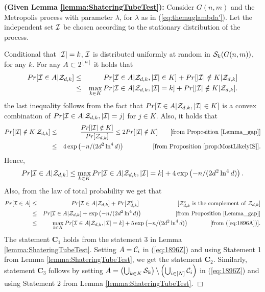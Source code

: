\documentclass[a4paper,10pt]{article}
\makeatletter
\newenvironment{lemmaproof}[1]{\noindent{\bf Proof of Lemma #1\@}}{\hfill $\Box$\\}
\newcommand\cZ{\mathcal{Z}}
\makeatother
\begin{document}
\begin{lemmaproof}{\ref{lemma:ShateringTube}}
{\bf (Given Lemma \ref{lemma:ShateringTubeTest}):}
Consider $G(n,m)$ and the Metropolis process with parameter 
$\lambda$, for $\lambda$ as in (\ref{eq:themuglambda'}).
Let the independent set ${\cal I}$ be chosen according to 
the stationary distribution of the process. 

Conditional that $|{\cal I}|=k$, ${\cal I}$ is distributed
uniformly at random in ${\cal S}_k(G(n,m))$, for any $k$.
For any $A\subset 2^{[n]}$ it holds that
\begin{eqnarray}
Pr[{\cal I}\in A |\cZ_{d,k} ]&\leq& Pr[{\cal I}\in A|\cZ_{d,k},|{\cal I}|\in K]+Pr[|{\cal I}|\notin K|\cZ_{d,k}]
\nonumber \\ 
&\leq&\displaystyle \max_{k\in K}Pr[{\cal I}\in A |\cZ_{d,k},|{\cal I}|=k]+Pr[|{\cal I}|\notin K|\cZ_{d,k}].
\nonumber
\end{eqnarray}
the last inequality follows from the fact that $Pr[{\cal I}\in A|\cZ_{d,k},|{\cal I}|\in K]$
is a convex combination of $Pr[{\cal I}\in A |\cZ_{d,k},|{\cal I}|=j]$ for $j\in K$.
Also, it holds  that
\begin{eqnarray}
Pr[|{\cal I}|\notin K|\cZ_{d,k}]&\leq &
\frac{Pr[|{\cal I}|\notin K]} {Pr[\cZ_{d,k}]}\leq 2Pr[|{\cal I}|\notin K] \qquad  \mbox{[from Proposition \ref{Lemma_gap}]} \nonumber\\
&\leq& 4\exp\left(-n/(2d^2\ln^4 d)\right) \hspace{1.6cm} \mbox{[from Proposition \ref{prop:MostLikelyIS}].}\nonumber
\end{eqnarray}
Hence,
\begin{equation}\label{eq:1896A}
Pr[{\cal I}\in A |\cZ_{d,k} ]\leq \max_{k\in K}Pr[{\cal I}\in A |\cZ_{d,k},|{\cal I}|=k]+
4\exp\left(-n/(2d^2\ln^4 d)\right).
\end{equation}
Also, from the law of total probability we get that
\begin{eqnarray}
Pr[{\cal I}\in A]&\leq& Pr[{\cal I}\in A |\cZ_{d,k}]+Pr[\cZ^c_{d,k}]
\hspace*{2.3cm}  \mbox{[$\cZ^c_{d,k}$ is the complement of $\cZ_{d,k}$]}
\nonumber \\
&\leq &  Pr[{\cal I}\in A |\cZ_{d,k}]+\exp\left(-n/(2d^2\ln^4 d)\right) 
\hspace*{2cm}\mbox{[from Proposition \ref{Lemma_gap}]} \nonumber \\
&\leq&\max_{k\in K}Pr[{\cal I}\in A |\cZ_{d,k},|{\cal I}|=k]+
5\exp\left(-n/(2d^2\ln^4 d)\right) \hspace*{1.3cm}\mbox{[from (\ref{eq:1896A})]}. \label{eq:1896Z}
\end{eqnarray}
\noindent
The statement $\mathbf C_1$  holds  from the statement 3 in Lemma
\ref{lemma:ShateringTubeTest}. Setting   $A={\cal C}_i$ in (\ref{eq:1896Z})
and using Statement 1 from Lemma \ref{lemma:ShateringTubeTest}, we
get the statement $\mathbf C_2$. Similarly, statement $\mathbf C_3$
follows by setting $A=\left(\bigcup_{k\in K}{\cal S}_k\right)\backslash
\left(\bigcup_{i\in[N]}{\cal C}_i\right)$ in (\ref{eq:1896Z})
and  using Statement 2  from Lemma \ref{lemma:ShateringTubeTest}.
\end{lemmaproof}
\end{document}
